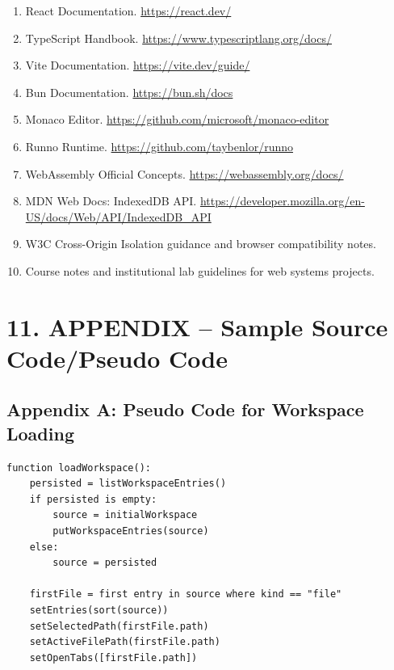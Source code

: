 \begin{enumerate}[leftmargin=8mm]
\item React Documentation. \url{https://react.dev/}
\item TypeScript Handbook. \url{https://www.typescriptlang.org/docs/}
\item Vite Documentation. \url{https://vite.dev/guide/}
\item Bun Documentation. \url{https://bun.sh/docs}
\item Monaco Editor. \url{https://github.com/microsoft/monaco-editor}
\item Runno Runtime. \url{https://github.com/taybenlor/runno}
\item WebAssembly Official Concepts. \url{https://webassembly.org/docs/}
\item MDN Web Docs: IndexedDB API. \url{https://developer.mozilla.org/en-US/docs/Web/API/IndexedDB_API}
\item W3C Cross-Origin Isolation guidance and browser compatibility notes.
\item Course notes and institutional lab guidelines for web systems projects.
\end{enumerate}

\newpage
\section{11. APPENDIX -- Sample Source Code/Pseudo Code}

\subsection*{Appendix A: Pseudo Code for Workspace Loading}
\begin{lstlisting}[style=pystyle,caption={Pseudo Code -- Workspace Initialization}]
function loadWorkspace():
    persisted = listWorkspaceEntries()
    if persisted is empty:
        source = initialWorkspace
        putWorkspaceEntries(source)
    else:
        source = persisted

    firstFile = first entry in source where kind == "file"
    setEntries(sort(source))
    setSelectedPath(firstFile.path)
    setActiveFilePath(firstFile.path)
    setOpenTabs([firstFile.path])
\end{lstlisting}

